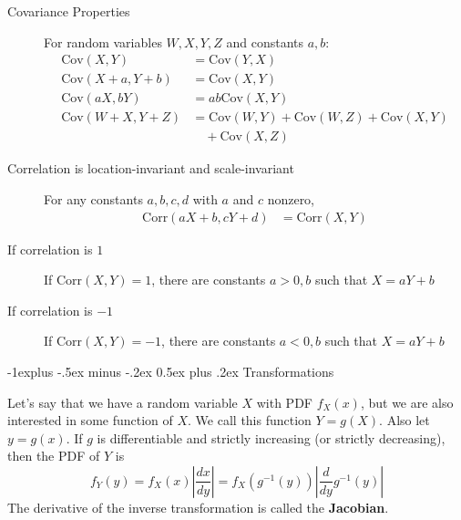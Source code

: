 \documentclass[10pt,landscape]{article}
\makeatletter
\newcommand{\var}{\textrm{Var}}
\newcommand{\cov}{\textrm{Cov}}
\newcommand{\corr}{\textrm{Corr}}
\renewcommand{\subsection}{\@startsection{subsection}{2}{0mm}%
                                {-1explus -.5ex minus -.2ex}%
                                {0.5ex plus .2ex}%
                                {\normalfont\normalsize\bfseries}}
\makeatother
\begin{document}
\begin{multicols*}{3}
\begin{description}
\item [Covariance Properties]  For random variables $W, X, Y, Z$ and constants $a, b$:
    \begin{align*}
    	\cov(X, Y) &= \cov(Y, X) \\
        \cov(X + a, Y + b) &= \cov(X, Y) \\
        \cov(aX, bY) &= ab\cov(X, Y) \\
        \cov(W + X, Y + Z) &= \cov(W, Y) + \cov(W, Z) + \cov(X, Y)\\
        &\quad + \cov(X, Z)
    \end{align*}
\item [Correlation is location-invariant and scale-invariant] For any constants $a,b,c,d$ with $a$ and $c$ nonzero,
    \begin{align*}
        \corr(aX + b, cY + d) &= \corr(X, Y)
    \end{align*}
\item [If correlation is $1$] If $\corr(X,Y)=1$, there are constants $a>0, b$ such that $X=aY+b$
\item [If correlation is $-1$] If $\corr(X,Y)=-1$, there are constants $a<0, b$ such that $X=aY+b$
\end{description}

\subsection{Transformations}
\begin{description}
    \label{one variable transformations}
    \item[One Variable Transformations] Let's say that we have a random variable $X$ with PDF $f_X(x)$, but we are also interested in some function of $X$. We call this function $Y = g(X)$. Also let $y=g(x)$. If $g$ is differentiable and strictly increasing (or strictly decreasing), then the PDF of $Y$ is
    \[f_Y(y) = f_X(x)\left|\frac{dx}{dy}\right| =  f_X(g^{-1}(y))\left|\frac{d}{dy}g^{-1}(y)\right|\]
    The derivative of the inverse transformation is called the \textbf{Jacobian}.



\end{description}
\end{multicols*}
\end{document}
